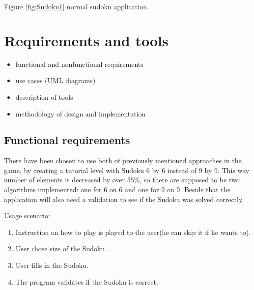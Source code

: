 \documentclass[a4paper,twoside,12pt]{book}
\begin{document}
Figure \ref{fig:Sudoku1} normal sudoku application.

\chapter{Requirements and tools}

\begin{itemize}
\item functional and nonfunctional requirements
\item use cases (UML diagrams)
\item description of tools
\item methodology of design and implementation
\end{itemize} 

\clearpage


\section{Functional requirements}
\par
There have been chosen to use both of previously mentioned approaches in the game, by creating a tutorial level with Sudoku 6 by 6 instead of 9 by 9. This way number of elements is decreased by over 55\%, so there are supposed to be two algorithms implemented: one for 6 on 6 and one for 9 on 9. Beside that the application will also need a validation to see if the Sudoku was solved correctly.
\par
Usage scenario:
\begin{enumerate}
	\item Instruction on how to play is played to the user(he can skip it if he wants to).
	\item User chose size of the Sudoku.
	\item User fills in the Sudoku.
	\item The program validates if the Sudoku is correct.
\end{enumerate}
\end{document}
